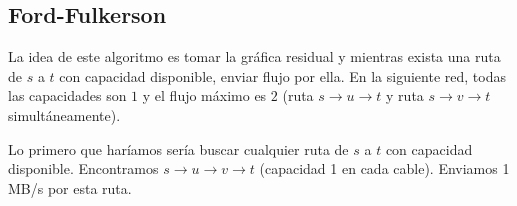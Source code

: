 \subsection{Ford-Fulkerson}
 
La idea de este algoritmo es tomar la gráfica residual y mientras exista una ruta de $s$ a $t$ con capacidad disponible, enviar flujo por ella. En la siguiente red, todas las capacidades son $1$ y el flujo máximo es $2$ (ruta $s\to u\to t$ y ruta $s\to v\to t$ simultáneamente).
 
\begin{figure}[H]
\centering
{}
\end{figure}
 
Lo primero que haríamos sería buscar cualquier ruta de $s$ a $t$ con capacidad disponible. Encontramos $s \to u \to v \to t$ (capacidad 1 en cada cable). Enviamos 1 MB/s por esta ruta.
 
